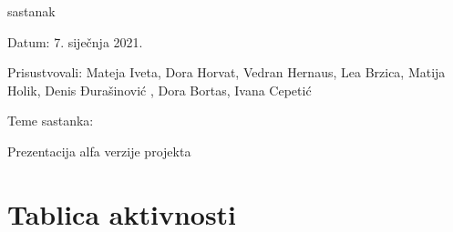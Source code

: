 \begin{packed_enum}
			\item sastanak
			\item[] \begin{packed_item}
				\item Datum: 7. siječnja 2021.
				\item Prisustvovali: Mateja Iveta, Dora Horvat, Vedran Hernaus, Lea Brzica, Matija Holik, Denis Đurašinović , Dora Bortas, Ivana Cepetić
				\item Teme sastanka:
				\begin{packed_item}
					\item Prezentacija alfa verzije projekta
				\end{packed_item}
			\end{packed_item}
			
			
		\end{packed_enum}
		
		\eject
		\section*{Tablica aktivnosti}
		
						
			
